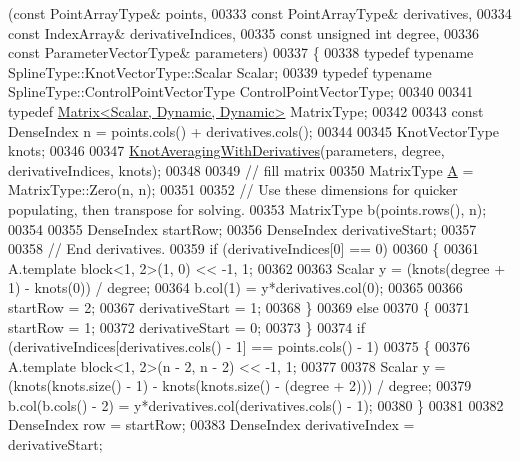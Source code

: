 \begin{DoxyCode}
      (\textcolor{keyword}{const} PointArrayType& points,
00333                                                         \textcolor{keyword}{const} PointArrayType& derivatives,
00334                                                         \textcolor{keyword}{const} IndexArray& derivativeIndices,
00335                                                         \textcolor{keyword}{const} \textcolor{keywordtype}{unsigned} \textcolor{keywordtype}{int} degree,
00336                                                         \textcolor{keyword}{const} ParameterVectorType& parameters)
00337   \{
00338     \textcolor{keyword}{typedef} \textcolor{keyword}{typename} SplineType::KnotVectorType::Scalar Scalar;      
00339     \textcolor{keyword}{typedef} \textcolor{keyword}{typename} SplineType::ControlPointVectorType ControlPointVectorType;
00340 
00341     \textcolor{keyword}{typedef} \hyperlink{group___core___module}{Matrix<Scalar, Dynamic, Dynamic>} MatrixType;
00342 
00343     \textcolor{keyword}{const} DenseIndex n = points.cols() + derivatives.cols();
00344     
00345     KnotVectorType knots;
00346 
00347     \hyperlink{group___splines___module_gae10a6f9b6ab7fb400a2526b6382c533b}{KnotAveragingWithDerivatives}(parameters, degree, derivativeIndices, knots);
00348     
00349     \textcolor{comment}{// fill matrix}
00350     MatrixType \hyperlink{group___core___module_class_eigen_1_1_matrix}{A} = MatrixType::Zero(n, n);
00351 
00352     \textcolor{comment}{// Use these dimensions for quicker populating, then transpose for solving.}
00353     MatrixType b(points.rows(), n);
00354 
00355     DenseIndex startRow;
00356     DenseIndex derivativeStart;
00357 
00358     \textcolor{comment}{// End derivatives.}
00359     \textcolor{keywordflow}{if} (derivativeIndices[0] == 0)
00360     \{
00361       A.template block<1, 2>(1, 0) << -1, 1;
00362       
00363       Scalar y = (knots(degree + 1) - knots(0)) / degree;
00364       b.col(1) = y*derivatives.col(0);
00365       
00366       startRow = 2;
00367       derivativeStart = 1;
00368     \}
00369     \textcolor{keywordflow}{else}
00370     \{
00371       startRow = 1;
00372       derivativeStart = 0;
00373     \}
00374     \textcolor{keywordflow}{if} (derivativeIndices[derivatives.cols() - 1] == points.cols() - 1)
00375     \{
00376       A.template block<1, 2>(n - 2, n - 2) << -1, 1;
00377 
00378       Scalar y = (knots(knots.size() - 1) - knots(knots.size() - (degree + 2))) / degree;
00379       b.col(b.cols() - 2) = y*derivatives.col(derivatives.cols() - 1);
00380     \}
00381     
00382     DenseIndex row = startRow;
00383     DenseIndex derivativeIndex = derivativeStart;

\end{DoxyCode}
